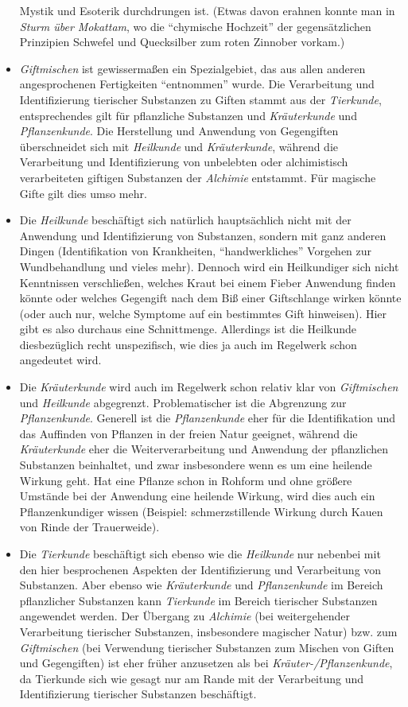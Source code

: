 \documentclass[10pt,a4paper,germanpar]{article}
\begin{document}
\begin{itemize}
  Mystik und Esoterik durchdrungen ist. (Etwas davon erahnen konnte man in
  \emph{Sturm über Mokattam}, wo die "`chymische Hochzeit"' der
  gegensätzlichen Prinzipien Schwefel und Quecksilber zum roten Zinnober
  vorkam.)
\item \emph{Giftmischen} ist gewissermaßen ein Spezialgebiet, das aus allen
  anderen angesprochenen Fertigkeiten "`entnommen"' wurde. Die Verarbeitung
  und Identifizierung tierischer Substanzen zu Giften stammt aus der
  \emph{Tierkunde}, entsprechendes gilt für pflanzliche Substanzen und
  \emph{Kräuterkunde} und \emph{Pflanzenkunde}. Die Herstellung und
  Anwendung von Gegengiften überschneidet sich mit \emph{Heilkunde}
  und \emph{Kräuterkunde}, während die Verarbeitung und Identifizierung von
  unbelebten oder alchimistisch verarbeiteten giftigen Substanzen der
  \emph{Alchimie} entstammt. Für magische Gifte gilt dies umso mehr.
\item Die \emph{Heilkunde} beschäftigt sich natürlich hauptsächlich nicht
  mit der Anwendung und Identifizierung von Substanzen, sondern mit ganz
  anderen Dingen (Identifikation von Krankheiten, "`handwerkliches"'
  Vorgehen zur Wundbehandlung und vieles mehr). Dennoch wird ein
  Heilkundiger sich nicht Kenntnissen verschließen, welches Kraut bei einem
  Fieber Anwendung finden könnte oder welches Gegengift nach dem Biß einer
  Giftschlange wirken könnte (oder auch nur, welche Symptome auf ein
  bestimmtes Gift hinweisen). Hier gibt es also durchaus eine Schnittmenge.
  Allerdings ist die Heilkunde diesbezüglich recht unspezifisch, wie dies ja
  auch im Regelwerk schon angedeutet wird.
\item Die \emph{Kräuterkunde} wird auch im Regelwerk schon relativ klar von
  \emph{Giftmischen} und \emph{Heilkunde} abgegrenzt. Problematischer ist
  die Abgrenzung zur \emph{Pflanzenkunde}. Generell ist die
  \emph{Pflanzenkunde} eher für die Identifikation und das Auffinden von
  Pflanzen in der freien Natur geeignet, während die \emph{Kräuterkunde}
  eher die Weiterverarbeitung und Anwendung der pflanzlichen
  Substanzen beinhaltet, und zwar insbesondere wenn es um eine heilende
  Wirkung geht. Hat eine Pflanze schon in Rohform und ohne größere Umstände
  bei der Anwendung eine heilende Wirkung, wird dies auch ein
  Pflanzenkundiger wissen (Beispiel: schmerzstillende Wirkung durch Kauen
  von Rinde der Trauerweide).
\item Die \emph{Tierkunde} beschäftigt sich ebenso wie die \emph{Heilkunde}
  nur nebenbei mit den hier besprochenen Aspekten der Identifizierung und
  Verarbeitung von Substanzen. Aber ebenso wie \emph{Kräuterkunde} und
  \emph{Pflanzenkunde} im Bereich pflanzlicher Substanzen kann
  \emph{Tierkunde} im Bereich tierischer Substanzen angewendet werden. Der
  Übergang zu \emph{Alchimie} (bei weitergehender Verarbeitung tierischer
  Substanzen, insbesondere magischer Natur) bzw. zum \emph{Giftmischen} (bei
  Verwendung tierischer Substanzen zum Mischen von Giften und Gegengiften)
  ist eher früher anzusetzen als bei \emph{Kräuter-/Pflanzenkunde}, da
  Tierkunde sich wie gesagt nur am Rande mit der Verarbeitung und
  Identifizierung tierischer Substanzen beschäftigt.
\end{itemize}
\end{document}
